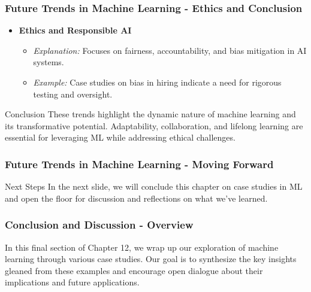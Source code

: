 \documentclass{beamer}
\begin{document}
\begin{frame}[fragile]
    \frametitle{Future Trends in Machine Learning - Ethics and Conclusion}
    \begin{itemize}
        \item \textbf{Ethics and Responsible AI}
            \begin{itemize}
                \item \textit{Explanation:} Focuses on fairness, accountability, and bias mitigation in AI systems.
                \item \textit{Example:} Case studies on bias in hiring indicate a need for rigorous testing and oversight.
            \end{itemize}
    \end{itemize}
    
    \begin{block}{Conclusion}
        These trends highlight the dynamic nature of machine learning and its transformative potential. 
        Adaptability, collaboration, and lifelong learning are essential for leveraging ML while addressing ethical challenges.
    \end{block}
\end{frame}

\begin{frame}[fragile]
    \frametitle{Future Trends in Machine Learning - Moving Forward}
    \begin{block}{Next Steps}
        In the next slide, we will conclude this chapter on case studies in ML and open the floor for discussion and reflections on what we've learned.
    \end{block}
\end{frame}

\begin{frame}[fragile]
    \frametitle{Conclusion and Discussion - Overview}
    In this final section of Chapter 12, we wrap up our exploration of machine learning through various case studies. Our goal is to synthesize the key insights gleaned from these examples and encourage open dialogue about their implications and future applications. 
\end{frame}
\end{document}
